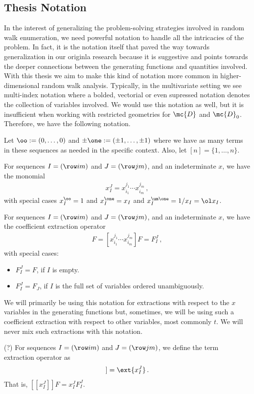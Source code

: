 \subsection{Thesis Notation}
In the interest of generalizing the problem-solving strategies involved in random walk enumeration, we need powerful notation to handle all the intricacies of the problem. In fact, it is the notation itself that paved the way towards generalization in our originla research because it is suggestive and points towards the deeper connections between the generating functions and quantities involved. With this thesis we aim to make this kind of notation more common in higher-dimensional random walk analysis. Typically, in the multivariate setting we see multi-index notation where a bolded, vectorial or even supressed notation denotes the collection of variables involved. We would use this notation as well, but it is insufficient when working with restricted geometries for $\mc{D}$ and $\mc{D}_0$. Therefore, we have the following notation.
\begin{definition} Let $\oo := (0,\ldots,0)$ and $\pm \one := (\pm 1,\ldots, \pm 1)$ where we have as many terms in these sequences as needed in the specific context. Also, let $[n] = \{1,\ldots, n\}$.
\end{definition}
\begin{definition} For sequences $I = (\row im)$ and $J = (\row jm)$, and an indeterminate $x$, we have the monomial
\begin{align}
	x_I^J = x_{i_1}^{j_1}\cdots x_{i_m}^{j_m}\,,
\end{align}
with special cases $x_I^{\oo} = 1$ and $x_I^{\one} = x_I$ and $x_I^{\um\one} = 1/x_I = \ol x_I$.
\end{definition}
\begin{definition} For sequences $I = (\row im)$ and $J = (\row jm)$, and an indeterminate $x$, we have the coefficient extraction operator
\begin{align}
	[x_I^J] F= [x_{i_1}^{j_1}\cdots x_{i_m}^{j_m}]F = F_I^J\,,
\end{align}
with special cases:
\begin{itemize}
	\item $F_I^{J} = F$, if $I$ is empty.
	\item $F_I^J = F_J$, if $I$ is the full set of variables ordered unambiguously.
\end{itemize}
\end{definition}
We will primarily be using this notation for extractions with respect to the $x$ variables in the generating functions but, sometimes, we will be using such a coefficient extraction with respect to other variables, most commonly $t$. We will never mix such extractions with this notation.
\begin{definition}  (?) For sequences $I = (\row im)$ and $J = (\row jm)$, we define the term extraction operator as
\begin{align}
	[[x_I^J]] = \ext{x_I^J}\,.
\end{align}
That is, $[[x_I^J]]F = x_I^J F_I^J$.
\end{definition}

